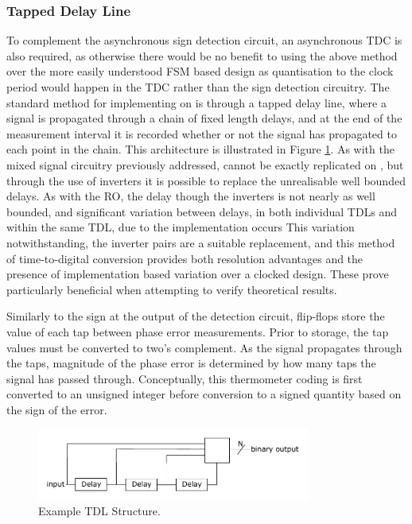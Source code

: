 \subsubsection{Tapped Delay Line}
To complement the asynchronous sign detection circuit, an asynchronous \ac{TDC} is also required, as otherwise there would be no benefit to using the above method over the more easily understood \ac{FSM} based design as quantisation to the clock period would happen in the \ac{TDC} rather than the sign detection circuitry. The standard method for implementing  on  is through a tapped delay line, where a signal is propagated through a chain of fixed length delays, and at the end of the measurement interval it is recorded whether or not the signal has propagated to each point in the chain. This architecture is illustrated in Figure \ref{fig:simple_tdc}. As with the mixed signal circuitry previously addressed,  cannot be exactly replicated on , but through the use of inverters it is possible to replace the unrealisable well bounded delays. As with the \ac{RO}, the delay though the inverters is not nearly as well bounded, and significant variation between delays, in both individual \acp{TDL} and within the same \ac{TDL}, due to the implementation occurs This variation notwithstanding, the inverter pairs are a suitable replacement, and this method of time-to-digital conversion provides both resolution advantages and the presence of implementation based variation over a clocked design. These prove particularly beneficial when attempting to verify theoretical results.

Similarly to the sign at the output of the detection circuit, flip-flops store the value of each tap between phase error measurements. Prior to storage, the tap values must be converted to two's complement. As the signal propagates through the taps, magnitude of the phase error is determined by how many taps the signal has passed through. Conceptually, this thermometer coding is first converted to an unsigned integer before conversion to a signed quantity based on the sign of the error.
\begin{figure}[h]
	\centering
	\includegraphics[width=0.8\textwidth]{../simple_tdc}
	\caption[Example \acl{TDL} Structure]{Example \acl{TDL} Structure.}
	\label{fig:simple_tdc}
\end{figure}

